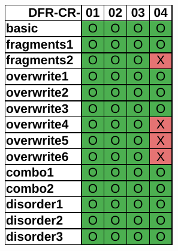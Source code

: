 \begin{figure}
\begin{subfigure}{0.3\linewidth}
        \includegraphics[width=\linewidth]{fig/ftk_results_fat.pdf}
    \end{subfigure}
    \begin{subfigure}{0.3\linewidth}

\end{subfigure}
\end{figure}
